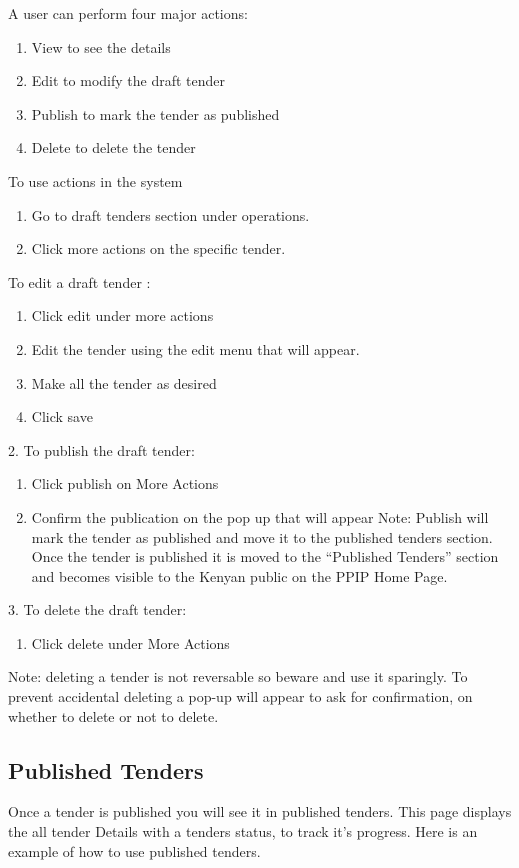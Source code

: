 \documentclass [12pt]{book}
\begin{document}
A user can perform four major actions:
\begin{enumerate}
\item	View to see the details
\item	Edit to modify the draft tender 
\item	Publish to mark the tender as published 
\item	Delete to delete the tender
\end{enumerate}

To use actions in the system 
\begin{enumerate}
\item	Go to draft tenders section under operations.
\item	Click more actions on the specific tender.
\end{enumerate}


To edit a draft tender :
\begin{enumerate}
\item	Click edit under more actions
\item	Edit the tender using the edit menu that will appear.
\item	Make all the tender as desired
\item	Click save
\end{enumerate}

2.	To publish the draft tender:
\begin{enumerate}

\item Click publish on More Actions
\item Confirm the publication on the pop up that will appear
Note: Publish will mark the tender as published and move it to the published tenders section. 
Once the tender is published it is moved to the “Published Tenders” section and becomes visible to the Kenyan public on the PPIP Home Page.
 
\end{enumerate}
3.	To delete the draft tender:
\begin{enumerate}
    \item Click delete under More Actions
\end{enumerate}
Note: deleting a tender is not reversable so beware and use it sparingly.
To prevent accidental deleting a pop-up will appear to ask for confirmation, on whether to delete or not to delete.




\subsection{Published Tenders}
Once a tender is published you will see it in published tenders.
This page displays the all tender Details with a tenders status, to track it’s progress. Here is an example of how to use published tenders.
\end{document}
